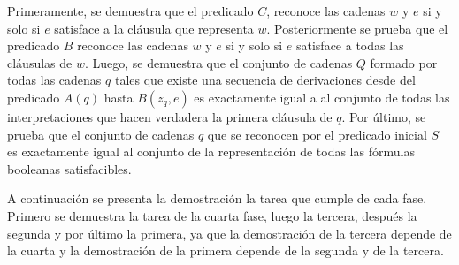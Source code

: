 \documentclass[12pt]{article}
\begin{document}
Primeramente, se demuestra que el predicado $C$, reconoce las cadenas $w$ y $e$
si y solo si $e$ satisface a la cláusula que representa $w$. Posteriormente se prueba que el predicado $B$ reconoce las cadenas $w$ y $e$ si y solo si $e$ satisface a todas las
cláusulas de $w$. Luego, se demuestra que el conjunto de cadenas $Q$ formado por todas las cadenas $q$ tales que existe una secuencia de
derivaciones desde del predicado $A(q)$ hasta $B(z_q,e)$ es exactamente igual a al conjunto de todas las
interpretaciones que hacen verdadera la primera cláusula de $q$. Por último, se prueba que el conjunto de cadenas $q$ que se
reconocen por el predicado inicial $S$ es exactamente igual al conjunto de la representación de
todas las fórmulas booleanas satisfacibles.

A continuación se presenta la demostración la tarea que cumple de cada fase. Primero se demuestra la tarea de la cuarta fase, luego la tercera, después la segunda y por último la primera, ya que la demostración de la tercera depende de la cuarta y la demostración de la primera depende de la segunda y de la tercera.
\end{document}
